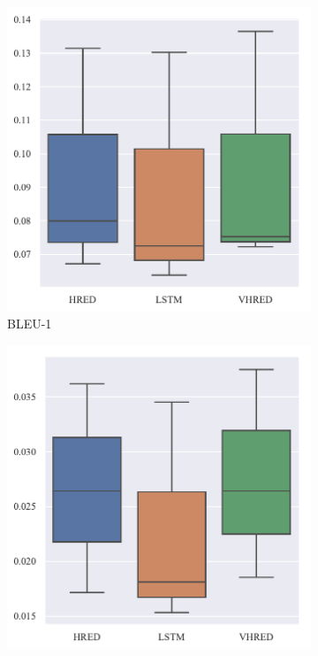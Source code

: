 \begin{figure}[H]
    \begin{subfigure}{0.25\linewidth}
        \centering
        \includegraphics[width=\linewidth]{figure/boxplot/model/bleu_1/plot.pdf}
        \caption{BLEU-1}
    \end{subfigure}%
    \begin{subfigure}{0.25\linewidth}
        \centering
        \includegraphics[width=\linewidth]{figure/boxplot/model/bleu_2/plot.pdf}

\end{subfigure}
\end{figure}
